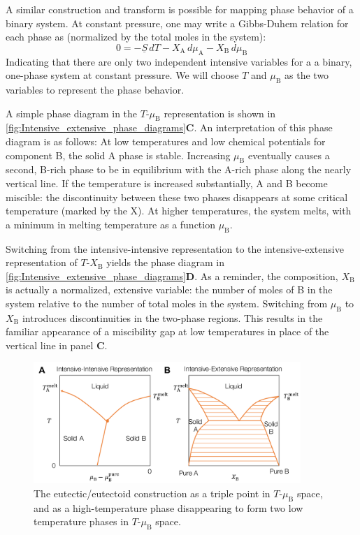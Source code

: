 \documentclass[12pt]{article}
\begin{document}
A similar construction and transform is possible for mapping phase behavior of a binary system. At constant pressure, one may write a Gibbs-Duhem relation for each phase as (normalized by the total moles in the system):
\begin{equation}
	0=-\underline{S}\,dT - X_{\text{A}} \, d\mu_\text{A}- X_{\text{B}} \, d\mu_\text{B}
\end{equation}
Indicating that there are only two independent intensive variables for a a binary, one-phase system at constant pressure. We will choose \(T\) and \(\mu_\text{B}\) as the two variables to represent the phase behavior.

A simple phase diagram in the \(T\)-\(\mu_\text{B}\) representation is shown in \ref{fig:Intensive_extensive_phase_diagrams}\textbf{C}. An interpretation of this phase diagram is as follows: At low temperatures and low chemical potentials for component B, the solid A phase is stable. Increasing \(\mu_{\text{B}}\) eventually causes a second, B-rich phase to be in equilibrium with the A-rich phase along the nearly vertical line. If the temperature is increased substantially, A and B become miscible: the discontinuity between these two phases disappears at some critical temperature (marked by the X). At higher temperatures, the system melts, with a minimum in melting temperature as a function \(\mu_\text{B}\). 

Switching from the intensive-intensive representation to the intensive-extensive representation of \(T\)-\(X_{\text{B}}\) yields the phase diagram in \ref{fig:Intensive_extensive_phase_diagrams}\textbf{D}. As a reminder, the composition, \(X_{\text{B}}\) is actually a normalized, extensive variable: the number of moles of B in the system relative to the number of total moles in the system. Switching from \(\mu_\text{B}\) to \(X_{\text{B}}\) introduces discontinuities in the two-phase regions. This results in the familiar appearance of a miscibility gap at low temperatures in place of the vertical line in panel \textbf{C}.

\begin{figure}[!h]
\centering
\includegraphics[width=0.9\textwidth]{Intensive_extensive_eutectics}
\caption{The eutectic/eutectoid construction as a triple point in $T$-$\mu_\text{B}$ space, and as a high-temperature phase disappearing to form two low temperature phases in $T$-$\mu_\text{B}$ space.}
\label{fig:Intensive_extensive_eutectics}
\end{figure}
\end{document}
